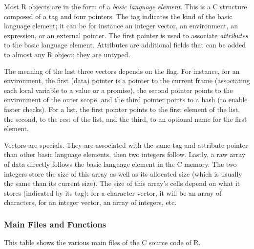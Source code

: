\documentclass{article}
\newcommand\R{R}
\newcommand\Cn{C}
\begin{document}
Most \R{} objects are in the form of a \emph{basic language element}.
This is a \Cn{} structure composed of a tag and four pointers.
The tag indicates the kind of the basic language element;
it can be for instance an integer vector, an environment, an expression, or an external pointer.
The first pointer is used to associate \emph{attributes} to the basic language element.
Attributes are additional fields that can be added to almost any \R{} object;
they are untyped.

The meaning of the last three vectors depends on the flag.
%
For instance, for an environment, the first (data) pointer is a pointer
to the current frame (associating each local variable to a value or a promise),
the second pointer points to the environment of the outer scope,
and the third pointer points to a hash (to enable faster checks).
%
For a list, the first pointer points to the first element of the list,
the second, to the rest of the list,
and the third, to an optional name for the first element.

Vectors are specials.
They are associated with the same tag and attribute pointer
than other basic language elements,
then two integers follow.
Lastly, a raw array of data directly follows the basic language element in the \Cn{} memory.
The two integers store the size of this array as well as its allocated size
(which is usually the same than its current size).
The size of this array’s cells depend on what it stores
(indicated by its tag):
for a character vector, it will be an array of characters,
for an integer vector, an array of integers, etc.


\subsubsection{Main Files and Functions}
\label{sec:files}

This table shows the various main files of the \Cn{} source code of \R{}.
\end{document}
